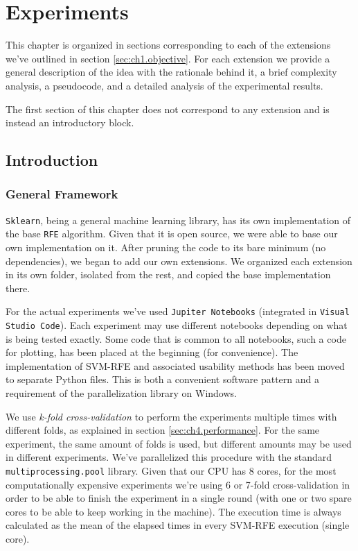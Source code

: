 \chapter{Experiments}
\label{Chapter5}

This chapter is organized in sections corresponding to each of the extensions we've outlined in section \ref{sec:ch1.objective}. For each extension we provide a general description of the idea with the rationale behind it, a brief complexity analysis, a pseudocode, and a detailed analysis of the experimental results.

The first section of this chapter does not correspond to any extension and is instead an introductory block.

\section{Introduction}

\subsection{General Framework}

\texttt{Sklearn}, being a general machine learning library, has its own implementation of the base \texttt{RFE} algorithm. Given that it is open source, we were able to base our own implementation on it. After pruning the code to its bare minimum (no dep\-en\-den\-cies), we began to add our own extensions. We organized each extension in its own folder, isolated from the rest, and copied the base implementation there.

For the actual experiments we've used \texttt{Jupiter Notebooks} (integrated in \texttt{Visual Studio Code}). Each experiment may use different notebooks depending on what is being tested exactly. Some code that is common to all notebooks, such a code for plotting, has been placed at the beginning (for convenience). The implementation of SVM-RFE and associated usability methods has been moved to separate Python files. This is both a convenient software pattern and a requirement of the parallelization library on Windows.

We use \emph{k-fold cross-validation} to perform the experiments multiple times with different folds, as explained in section \ref{sec:ch4.performance}. For the same experiment, the same amount of folds is used, but different amounts may be used in different experiments. We've parallelized this procedure with the standard \texttt{multiprocessing.pool} library. Given that our CPU has 8 cores, for the most computationally expensive experiments we're using 6 or 7-fold cross-validation in order to be able to finish the experiment in a single round (with one or two spare cores to be able to keep working in the machine). The execution time is always calculated as the mean of the elapsed times in every SVM-RFE execution (single core).

